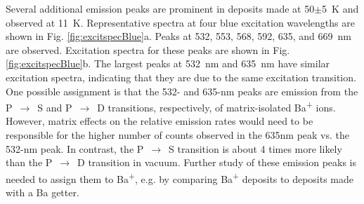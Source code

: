 Several additional emission peaks are prominent in deposits made at 50$\pm$5~K and observed at 11~K.  Representative spectra at four blue excitation wavelengths are shown in Fig. \ref{fig:excitspecBlue}a.  Peaks at 532, 553, 568, 592, 635, and 669~nm are observed.  Excitation spectra for these peaks are shown in Fig. \ref{fig:excitspecBlue}b.  The largest peaks at 532~nm and 635~nm have similar excitation spectra, indicating that they are due to the same excitation transition.  One possible assignment is that the 532- and 635-nm peaks are emission from the P~$\rightarrow$~S and P~$\rightarrow$~D transitions, respectively, of matrix-isolated Ba\textsuperscript{+} ions.  However, matrix effects on the relative emission rates would need to be responsible for the higher number of counts observed in the 635nm peak vs. the 532-nm peak.  In contrast, the P~$\rightarrow$~S transition is about 4 times more likely than the P~$\rightarrow$~D transition in vacuum.  Further study of these emission peaks is needed to assign them to Ba\textsuperscript{+}, e.g. by comparing Ba\textsuperscript{+} deposits to deposits made with a Ba getter.






